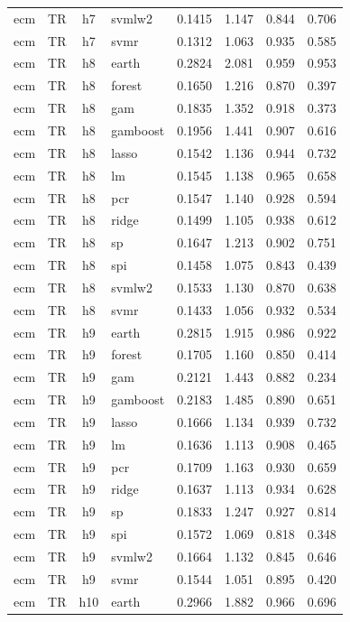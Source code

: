 \begin{ThreePartTable}
\begin{longtable}[t]{llclcccc}
ecm & TR & h7 & svmlw2 & 0.1415 & 1.147 & 0.844 & 0.706\\
ecm & TR & h7 & svmr & 0.1312 & 1.063 & 0.935 & 0.585\\
\addlinespace
ecm & TR & h8 & earth & 0.2824 & 2.081 & 0.959 & 0.953\\
ecm & TR & h8 & forest & 0.1650 & 1.216 & 0.870 & 0.397\\
ecm & TR & h8 & gam & 0.1835 & 1.352 & 0.918 & 0.373\\
ecm & TR & h8 & gamboost & 0.1956 & 1.441 & 0.907 & 0.616\\
ecm & TR & h8 & lasso & 0.1542 & 1.136 & 0.944 & 0.732\\
ecm & TR & h8 & lm & 0.1545 & 1.138 & 0.965 & 0.658\\
ecm & TR & h8 & pcr & 0.1547 & 1.140 & 0.928 & 0.594\\
ecm & TR & h8 & ridge & 0.1499 & 1.105 & 0.938 & 0.612\\
ecm & TR & h8 & sp & 0.1647 & 1.213 & 0.902 & 0.751\\
ecm & TR & h8 & spi & 0.1458 & 1.075 & 0.843 & 0.439\\
ecm & TR & h8 & svmlw2 & 0.1533 & 1.130 & 0.870 & 0.638\\
ecm & TR & h8 & svmr & 0.1433 & 1.056 & 0.932 & 0.534\\
\addlinespace
ecm & TR & h9 & earth & 0.2815 & 1.915 & 0.986 & 0.922\\
ecm & TR & h9 & forest & 0.1705 & 1.160 & 0.850 & 0.414\\
ecm & TR & h9 & gam & 0.2121 & 1.443 & 0.882 & 0.234\\
ecm & TR & h9 & gamboost & 0.2183 & 1.485 & 0.890 & 0.651\\
ecm & TR & h9 & lasso & 0.1666 & 1.134 & 0.939 & 0.732\\
ecm & TR & h9 & lm & 0.1636 & 1.113 & 0.908 & 0.465\\
ecm & TR & h9 & pcr & 0.1709 & 1.163 & 0.930 & 0.659\\
ecm & TR & h9 & ridge & 0.1637 & 1.113 & 0.934 & 0.628\\
ecm & TR & h9 & sp & 0.1833 & 1.247 & 0.927 & 0.814\\
ecm & TR & h9 & spi & 0.1572 & 1.069 & 0.818 & 0.348\\
ecm & TR & h9 & svmlw2 & 0.1664 & 1.132 & 0.845 & 0.646\\
ecm & TR & h9 & svmr & 0.1544 & 1.051 & 0.895 & 0.420\\
\addlinespace
ecm & TR & h10 & earth & 0.2966 & 1.882 & 0.966 & 0.696\\

\end{longtable}
\end{ThreePartTable}

